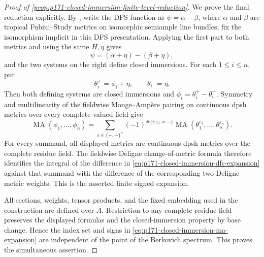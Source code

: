 \begin{proof}[Proof of
\cref{prop:p171-closed-immersion-finite-level-reduction}]
We prove the final reduction explicitly.  By
\cite[Definition~2.15]{PS23Hybrid}, write the DFS function as
\(\psi=\alpha-\beta\), where \(\alpha\) and \(\beta\) are tropical
Fubini--Study metrics on isomorphic semiample line bundles; fix the
isomorphism implicit in this DFS presentation.  Applying the first part to
both metrics and using the same \(H,\eta\) gives
\begin{equation}
\label{eq:p171-closed-immersion-dfs-expansion}
                    \psi=(\alpha+\eta)-(\beta+\eta),
\end{equation}
and the two systems on the right define closed immersions.  For each
\(1\leq i\leq n\), put
\[
                  \theta_i^+=\phi_i+\eta,
                  \qquad \theta_i^-=\eta.
\]
Then both defining systems are closed immersions and
\(\phi_i=\theta_i^+-\theta_i^-\).  Symmetry and multilinearity of the
fieldwise Monge--Amp\`ere pairing on continuous dpsh metrics over every
complete valued field
\cite[Proposition~8.5, Definition~8.7, and the paragraph following
Example~8.10]{BE21} give
\begin{equation}
\label{eq:p171-closed-immersion-ma-expansion}
 \operatorname{MA}(\phi_1,\ldots,\phi_n)
 =\sum_{\varepsilon\in\{+,-\}^n}
   (-1)^{\#\{i:\varepsilon_i=-\}}
   \operatorname{MA}(\theta_1^{\varepsilon_1},\ldots,
                     \theta_n^{\varepsilon_n}).
\end{equation}
For every summand, all displayed metrics are continuous dpsh metrics over
the complete residue field.  The fieldwise Deligne change-of-metric formula
\cite[Theorem~8.16 and formula~(8.9)]{BE21} therefore identifies the integral
of the difference in
\eqref{eq:p171-closed-immersion-dfs-expansion} against that summand with
the difference of the corresponding two Deligne-metric weights.  This is
the asserted finite signed expansion.

All sections, weights, tensor products, and the fixed embedding used in
the construction are defined over \(A\).  Restriction to any complete
residue field preserves the displayed formulas and the closed-immersion
property by base change.  Hence the index set and signs in
\eqref{eq:p171-closed-immersion-ma-expansion} are independent of the point
of the Berkovich spectrum.  This proves the simultaneous assertion.
\end{proof}
